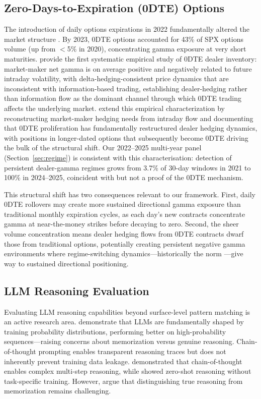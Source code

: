 \documentclass[jrfm,article,accept,moreauthors,pdftex]{Definitions/mdpi}
\begin{document}
\subsection{Zero-Days-to-Expiration (0DTE) Options}

The introduction of daily options expirations in 2022 fundamentally altered the market structure \citep{cboe2024zero}. By 2023, 0DTE options accounted for 43\% of SPX options volume (up from $<$5\% in 2020), concentrating gamma exposure at very short maturities. \citet{dim2023odtes} provide the first systematic empirical study of 0DTE dealer inventory: market-maker net gamma is on average positive and negatively related to future intraday volatility, with delta-hedging-consistent price dynamics that are inconsistent with information-based trading, establishing dealer-hedging rather than information flow as the dominant channel through which 0DTE trading affects the underlying market. %
 \citet{adams2025zerodte} extend this empirical characterization by reconstructing market-maker hedging needs from intraday flow and documenting that 0DTE proliferation has fundamentally restructured dealer hedging dynamics, with positions in longer-dated options that subsequently become 0DTE driving the bulk of the structural shift. Our 2022--2025 multi-year panel (Section~\ref{sec:regime}) is consistent with this characterisation: detection of persistent dealer-gamma regimes grows from 3.7\% of 30-day windows in 2021 to 100\% in 2024--2025, coincident with but not a proof of the 0DTE mechanism.

This structural shift has two consequences relevant to our framework. First, daily 0DTE rollovers may create more sustained directional gamma exposure than traditional monthly expiration cycles, as each day's new contracts concentrate gamma at near-the-money strikes before decaying to zero. Second, the sheer volume concentration means dealer hedging flows from 0DTE contracts dwarf those from traditional options, potentially creating persistent negative gamma environments where regime-switching \mbox{dynamics---historically} the norm \citep{ni2005stock}---give way to sustained directional positioning.

\subsection{LLM Reasoning Evaluation}

Evaluating LLM reasoning capabilities beyond surface-level pattern matching is an active research area. \citet{mccoy2023embers} demonstrate that LLMs are fundamentally shaped by training probability distributions, performing better on high-probability \mbox{sequences---raising} concerns about memorization versus genuine reasoning. Chain-of-thought prompting \citep{openai2024reasoning} enables transparent reasoning traces but does not inherently prevent training data leakage. \citet{wei2022chain} demonstrated that chain-of-thought enables complex multi-step reasoning, while \citet{kojima2022large} showed zero-shot reasoning without task-specific training. However, \citet{marcus2019rebooting} argue that distinguishing true reasoning from memorization remains challenging.
\end{document}
